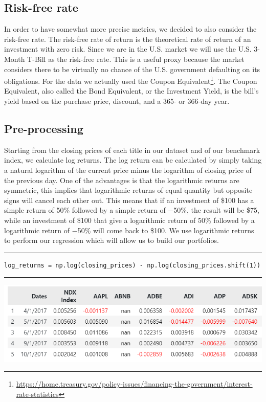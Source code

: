 \documentclass[twocolumn]{article}
\begin{document}
\subsection{Risk-free rate}
In order to have somewhat more precise metrics, we decided to also consider the risk-free rate. The risk-free rate of return is the theoretical rate of return of an investment with zero risk. Since we are in the U.S. market we will use the U.S. 3-Month T-Bill as the risk-free rate. This is a useful proxy because the market considers there to be virtually no chance of the U.S. government defaulting on its obligations. For the data we actually used the Coupon Equivalent\footnote{\url{https://home.treasury.gov/policy-issues/financing-the-government/interest-rate-statistics}}. The Coupon Equivalent, also called the Bond Equivalent, or the Investment Yield, is the bill's yield based on the purchase price, discount, and a 365- or 366-day year.
\subsection{Pre-processing}
Starting from the closing prices of each title in our dataset and of our benchmark index, we calculate log returns. The log return can be calculated by simply taking a natural logarithm of the current price minus the logarithm of closing price of the previous day. One of the advantages is that the logarithmic returns are symmetric, this implies that logarithmic returns of equal quantity but opposite signs will cancel each other out. This means that if an investment of \$100 has a simple return of 50\% followed by a simple return of −50\%, the result will be \$75, while an investment of \$100 that give a logarithmic return of 50\% followed by a logarithmic return of −50\% will come back to \$100.
We use logarithmic returns to perform our regression which will allow us to build our portfolios.
\rule{\linewidth}{0.4pt}
\vspace{-5 mm}
\begin{verbatim}
log_returns = np.log(closing_prices) - np.log(closing_prices.shift(1))
\end{verbatim}
\rule{\linewidth}{0.4pt}
\begin{center}
\includegraphics[scale=0.45]{logreturns.png}
\end{center}
\end{document}

